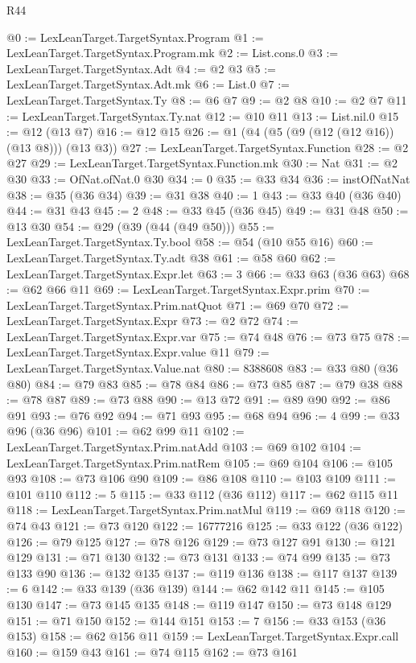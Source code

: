 \begin{lexlean}{R44}
\begin{coremodule}
@0 := LexLeanTarget.TargetSyntax.Program
@1 := LexLeanTarget.TargetSyntax.Program.mk
@2 := List.cons.{0}
@3 := LexLeanTarget.TargetSyntax.Adt
@4 := @2 @3
@5 := LexLeanTarget.TargetSyntax.Adt.mk
@6 := List.{0}
@7 := LexLeanTarget.TargetSyntax.Ty
@8 := @6 @7
@9 := @2 @8
@10 := @2 @7
@11 := LexLeanTarget.TargetSyntax.Ty.nat
@12 := @10 @11
@13 := List.nil.{0}
@15 := @12 (@13 @7)
@16 := @12 @15
@26 := @1 (@4 (@5 (@9 (@12 (@12 @16)) (@13 @8))) (@13 @3))
@27 := LexLeanTarget.TargetSyntax.Function
@28 := @2 @27
@29 := LexLeanTarget.TargetSyntax.Function.mk
@30 := Nat
@31 := @2 @30
@33 := OfNat.ofNat.{0} @30
@34 := 0
@35 := @33 @34
@36 := instOfNatNat
@38 := @35 (@36 @34)
@39 := @31 @38
@40 := 1
@43 := @33 @40 (@36 @40)
@44 := @31 @43
@45 := 2
@48 := @33 @45 (@36 @45)
@49 := @31 @48
@50 := @13 @30
@54 := @29 (@39 (@44 (@49 @50)))
@55 := LexLeanTarget.TargetSyntax.Ty.bool
@58 := @54 (@10 @55 @16)
@60 := LexLeanTarget.TargetSyntax.Ty.adt @38
@61 := @58 @60
@62 := LexLeanTarget.TargetSyntax.Expr.let
@63 := 3
@66 := @33 @63 (@36 @63)
@68 := @62 @66 @11
@69 := LexLeanTarget.TargetSyntax.Expr.prim
@70 := LexLeanTarget.TargetSyntax.Prim.natQuot
@71 := @69 @70
@72 := LexLeanTarget.TargetSyntax.Expr
@73 := @2 @72
@74 := LexLeanTarget.TargetSyntax.Expr.var
@75 := @74 @48
@76 := @73 @75
@78 := LexLeanTarget.TargetSyntax.Expr.value @11
@79 := LexLeanTarget.TargetSyntax.Value.nat
@80 := 8388608
@83 := @33 @80 (@36 @80)
@84 := @79 @83
@85 := @78 @84
@86 := @73 @85
@87 := @79 @38
@88 := @78 @87
@89 := @73 @88
@90 := @13 @72
@91 := @89 @90
@92 := @86 @91
@93 := @76 @92
@94 := @71 @93
@95 := @68 @94
@96 := 4
@99 := @33 @96 (@36 @96)
@101 := @62 @99 @11
@102 := LexLeanTarget.TargetSyntax.Prim.natAdd
@103 := @69 @102
@104 := LexLeanTarget.TargetSyntax.Prim.natRem
@105 := @69 @104
@106 := @105 @93
@108 := @73 @106 @90
@109 := @86 @108
@110 := @103 @109
@111 := @101 @110
@112 := 5
@115 := @33 @112 (@36 @112)
@117 := @62 @115 @11
@118 := LexLeanTarget.TargetSyntax.Prim.natMul
@119 := @69 @118
@120 := @74 @43
@121 := @73 @120
@122 := 16777216
@125 := @33 @122 (@36 @122)
@126 := @79 @125
@127 := @78 @126
@129 := @73 @127 @91
@130 := @121 @129
@131 := @71 @130
@132 := @73 @131
@133 := @74 @99
@135 := @73 @133 @90
@136 := @132 @135
@137 := @119 @136
@138 := @117 @137
@139 := 6
@142 := @33 @139 (@36 @139)
@144 := @62 @142 @11
@145 := @105 @130
@147 := @73 @145 @135
@148 := @119 @147
@150 := @73 @148 @129
@151 := @71 @150
@152 := @144 @151
@153 := 7
@156 := @33 @153 (@36 @153)
@158 := @62 @156 @11
@159 := LexLeanTarget.TargetSyntax.Expr.call
@160 := @159 @43
@161 := @74 @115
@162 := @73 @161

\end{coremodule}
\end{lexlean}
